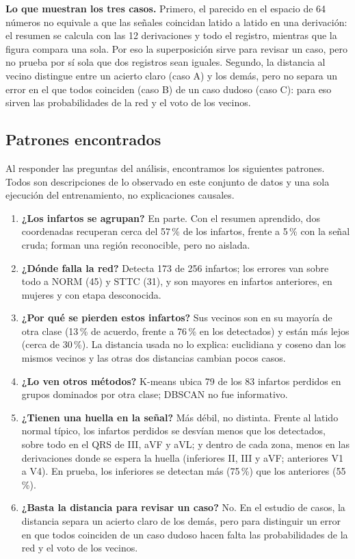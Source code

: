 \documentclass[conference]{IEEEtran}
\begin{document}
\textbf{Lo que muestran los tres casos.} Primero, el parecido en el espacio de 64 números no equivale a que las señales coincidan latido a latido en una derivación: el resumen se calcula con las 12 derivaciones y todo el registro, mientras que la figura compara una sola. Por eso la superposición sirve para revisar un caso, pero no prueba por sí sola que dos registros sean iguales. Segundo, la distancia al vecino distingue entre un acierto claro (caso A) y los demás, pero no separa un error en el que todos coinciden (caso B) de un caso dudoso (caso C): para eso sirven las probabilidades de la red y el voto de los vecinos.

\subsection{Patrones encontrados}
Al responder las preguntas del análisis, encontramos los siguientes patrones. Todos son descripciones de lo observado en este conjunto de datos y una sola ejecución del entrenamiento, no explicaciones causales.
\begin{enumerate}
\item \textbf{¿Los infartos se agrupan?} En parte. Con el resumen aprendido, dos coordenadas recuperan cerca del 57\,\% de los infartos, frente a 5\,\% con la señal cruda; forman una región reconocible, pero no aislada.
\item \textbf{¿Dónde falla la red?} Detecta 173 de 256 infartos; los errores van sobre todo a NORM (45) y STTC (31), y son mayores en infartos anteriores, en mujeres y con etapa desconocida.
\item \textbf{¿Por qué se pierden estos infartos?} Sus vecinos son en su mayoría de otra clase (13\,\% de acuerdo, frente a 76\,\% en los detectados) y están más lejos (cerca de 30\,\%). La distancia usada no lo explica: euclidiana y coseno dan los mismos vecinos y las otras dos distancias cambian pocos casos.
\item \textbf{¿Lo ven otros métodos?} K-means ubica 79 de los 83 infartos perdidos en grupos dominados por otra clase; DBSCAN no fue informativo.
\item \textbf{¿Tienen una huella en la señal?} Más débil, no distinta. Frente al latido normal típico, los infartos perdidos se desvían menos que los detectados, sobre todo en el QRS de III, aVF y aVL; y dentro de cada zona, menos en las derivaciones donde se espera la huella (inferiores II, III y aVF; anteriores V1 a V4). En prueba, los inferiores se detectan más (75\,\%) que los anteriores (55\,\%).
\item \textbf{¿Basta la distancia para revisar un caso?} No. En el estudio de casos, la distancia separa un acierto claro de los demás, pero para distinguir un error en que todos coinciden de un caso dudoso hacen falta las probabilidades de la red y el voto de los vecinos.
\end{enumerate}
\end{document}
